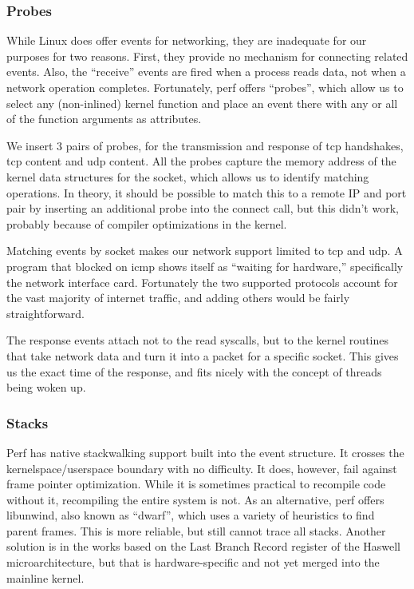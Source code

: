 \documentclass[10pt]{article}
\begin{document}
\subsubsection{Probes}

While Linux does offer events for networking, they are inadequate for our purposes for two reasons.  First, they provide no mechanism for connecting related events.  Also, the ``receive'' events are fired when a process reads data, not when a network operation completes.  Fortunately, perf offers ``probes'', which allow us to select any (non-inlined) kernel function and place an event there with any or all of the function arguments as attributes.

We insert 3 pairs of probes, for the transmission and response of tcp handshakes, tcp content and udp content.  All the probes capture the memory address of the kernel data structures for the socket, which allows us to identify matching operations.  In theory, it should be possible to match this to a remote IP and port pair by inserting an additional probe into the connect call, but this didn't work, probably because of compiler optimizations in the kernel.  

Matching events by socket makes our network support limited to tcp and udp.  A program that blocked on icmp shows itself as ``waiting for hardware,'' specifically the network interface card.  Fortunately the two supported protocols account for the vast majority of internet traffic, and adding others would be fairly straightforward.

The response events attach not to the read syscalls, but to the kernel routines that take network data and turn it into a packet for a specific socket.  This gives us the exact time of the response, and fits nicely with the concept of threads being woken up.

\subsubsection{Stacks}

Perf has native stackwalking support built into the event structure.  It crosses the kernelspace/userspace boundary with no difficulty.  It does, however, fail against frame pointer optimization.  While it is sometimes practical to recompile code without it, recompiling the entire system is not.  As an alternative, perf offers libunwind, also known as ``dwarf'', which uses a variety of heuristics to find parent frames.  This is more reliable, but still cannot trace all stacks.  Another solution is in the works based on the Last Branch Record register of the Haswell microarchitecture, but that is hardware-specific and not yet merged into the mainline kernel.\cite{lbr}
\end{document}
